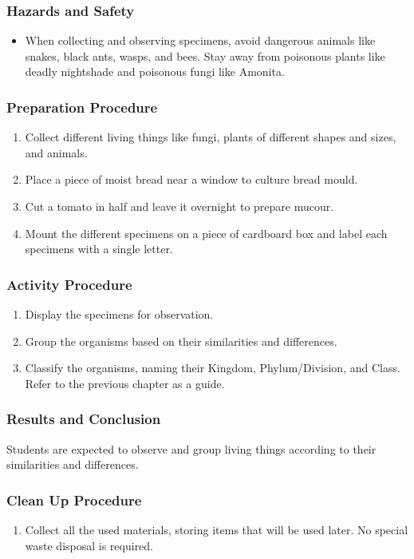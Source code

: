 \subsubsection*{Hazards and Safety}
\begin{itemize}
\item{When collecting and observing specimens, avoid dangerous animals like snakes, black ants, wasps, and bees. Stay away from poisonous plants like deadly nightshade and poisonous fungi like Amonita.}
\end{itemize}

\subsubsection*{Preparation Procedure}
\begin{enumerate}
\item{Collect different living things like fungi, plants of different shapes and sizes, and animals.}
\item{ Place a piece of moist bread near a window to culture bread mould.}
\item{ Cut a tomato in half and leave it overnight to prepare mucour.}
\item{Mount the different specimens on a piece of cardboard box and label each specimens with a single letter.}
\end{enumerate}

\subsubsection*{Activity Procedure}
\begin{enumerate}
\item{Display the specimens for observation.}
\item{Group the organisms based on their similarities and differences.}
\item{Classify the organisms, naming their Kingdom, Phylum/Division, and Class. Refer to the previous chapter as a guide.}
\end{enumerate}

\subsubsection*{Results and Conclusion}
Students are expected to observe and group living things according to their similarities and differences.

\subsubsection*{Clean Up Procedure}
\begin{enumerate}
\item{Collect all the used materials, storing items that will be used later. No special waste disposal is required.}
\end{enumerate}

